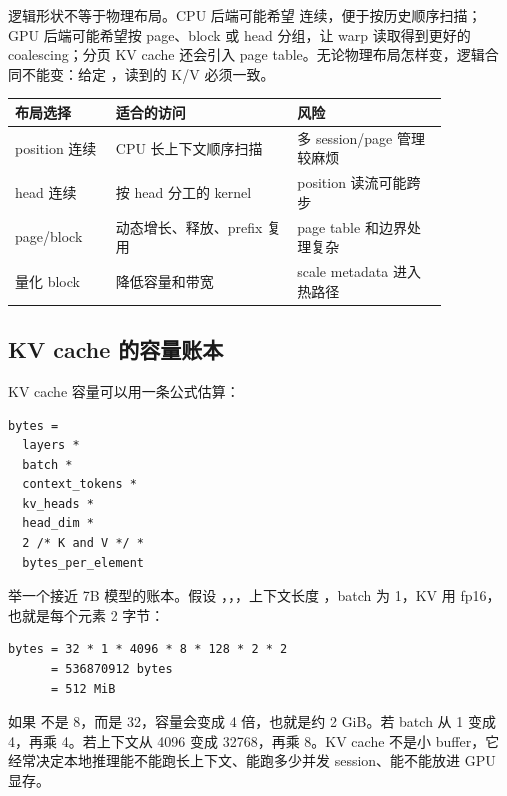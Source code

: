 逻辑形状不等于物理布局。CPU 后端可能希望  连续，便于按历史顺序扫描；GPU 后端可能希望按 page、block 或 head 分组，让 warp 读取得到更好的 coalescing；分页 KV cache 还会引入 page table。无论物理布局怎样变，逻辑合同不能变：给定 ，读到的 K/V 必须一致。

\begin{center}
\begin{tabular}{p{0.20\linewidth}p{0.36\linewidth}p{0.30\linewidth}}
\toprule
布局选择 & 适合的访问 & 风险 \\
\midrule
position 连续 & CPU 长上下文顺序扫描 & 多 session/page 管理较麻烦 \\
head 连续 & 按 head 分工的 kernel & position 读流可能跨步 \\
page/block & 动态增长、释放、prefix 复用 & page table 和边界处理复杂 \\
量化 block & 降低容量和带宽 & scale metadata 进入热路径 \\
\bottomrule
\end{tabular}
\end{center}

\subsection{KV cache 的容量账本}

KV cache 容量可以用一条公式估算：

\begin{lstlisting}[numbers=none,caption={KV cache 容量估算}]
bytes =
  layers *
  batch *
  context_tokens *
  kv_heads *
  head_dim *
  2 /* K and V */ *
  bytes_per_element
\end{lstlisting}

举一个接近 7B 模型的账本。假设 ，，，上下文长度 ，batch 为 1，KV 用 fp16，也就是每个元素 2 字节：

\begin{lstlisting}[numbers=none,caption={GQA 模型的 KV cache 例子}]
bytes = 32 * 1 * 4096 * 8 * 128 * 2 * 2
      = 536870912 bytes
      = 512 MiB
\end{lstlisting}

如果  不是 8，而是 32，容量会变成 4 倍，也就是约 2 GiB。若 batch 从 1 变成 4，再乘 4。若上下文从 4096 变成 32768，再乘 8。KV cache 不是小 buffer，它经常决定本地推理能不能跑长上下文、能跑多少并发 session、能不能放进 GPU 显存。

